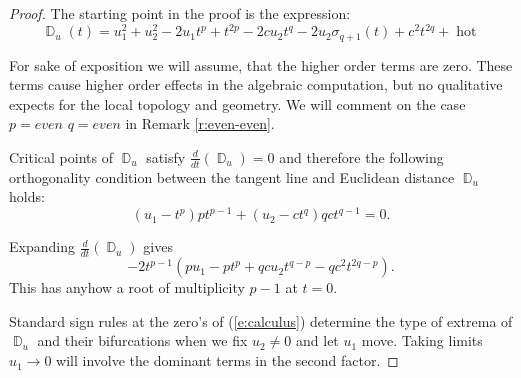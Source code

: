 \documentclass[12pt,a4,twoside]{amsart}
\DeclareMathOperator{\sq}{\mathbb{D}}
\DeclareMathOperator{\hot}{hot}
\newtheorem*{main lemma}{The main lemma}
\begin{document}
\begin{proof}
The starting point in the proof is the expression:
\begin{equation}\label{e:sqd2}
\sq_u(t)  = u_1^2 + u_2^2 - 2u_1 t^p + t^{2p}  - 2 c u_2 t^q    -2 u_2 \sigma_{q+1}(t)   + c^2 t^{2q} + \hot  
\end{equation}

For sake of exposition we will assume, that the higher order terms are zero. These terms cause higher order effects in the algebraic computation, but no qualitative expects for the local topology and geometry. We will comment on the case $p = even$ $q = even$ in Remark  \ref{r:even-even}.

 Critical points of $\sq_u$  satisfy $\frac{d}{dt}(\sq_u )= 0$ and therefore the following 
orthogonality condition  between the tangent line and Euclidean distance $\sq_u$ holds:
\begin{equation} \label{e:normality-0}
(u_1 -t ^p) p t^{p-1} + (u_2 - c t^q) q c t ^{q-1}= 0.
\end{equation}

Expanding $\frac{d}{dt}(\sq_u )$  gives
\begin{equation}  \label{e:calculus}
  - 2 t^{p-1}  (p  u_1 -p t ^{p}   + q c u_2 t ^{q-p} - q c ^2 t ^{2q-p}).
\end{equation}
This has anyhow a root of multiplicity $p-1$ at $t=0$. 


Standard sign rules at the zero's of (\ref{e:calculus}) determine the type of extrema of $\sq_u$ and their bifurcations when we fix $u_2 \ne 0$ and  let $u_1$ move.
Taking limits $u_1 \to 0$ will involve the dominant terms in the second factor. 


\end{proof}
\end{document}
